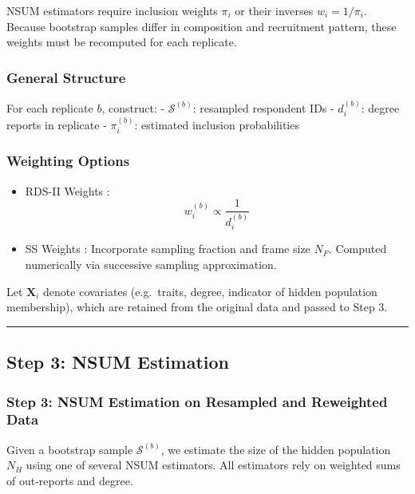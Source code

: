 \documentclass[
  12pt,
  letterpaper,
  DIV=11,
  numbers=noendperiod]{scrartcl}
\theoremstyle{plain}
\theoremstyle{definition}
\begin{document}
NSUM estimators require inclusion weights \(\pi_i\) or their inverses
\(w_i = 1 / \pi_i\). Because bootstrap samples differ in composition and
recruitment pattern, these weights must be recomputed for each
replicate.

\subsubsection{General Structure}\label{general-structure}

For each replicate \(b\), construct: - \(\mathcal{S}^{(b)}\): resampled
respondent IDs - \(d_i^{(b)}\): degree reports in replicate -
\(\pi_i^{(b)}\): estimated inclusion probabilities

\subsubsection{Weighting Options}\label{weighting-options}

\begin{itemize}
\item
  RDS-II Weights \autocite{volz08-probability}: \[
  w_i^{(b)} \propto \frac{1}{d_i^{(b)}}
  \]
\item
  SS Weights \autocite{gile11-improved}: Incorporate sampling fraction
  and frame size \(N_F\). Computed numerically via successive sampling
  approximation.
\end{itemize}

Let \(\mathbf{X}_i\) denote covariates (e.g.~traits, degree, indicator
of hidden population membership), which are retained from the original
data and passed to Step 3.

\begin{center}\rule{0.5\linewidth}{0.5pt}\end{center}

\subsection{Step 3: NSUM Estimation}\label{step-3-nsum-estimation}

\subsubsection{Step 3: NSUM Estimation on Resampled and Reweighted
Data}\label{step-3-nsum-estimation-on-resampled-and-reweighted-data}

Given a bootstrap sample \(\mathcal{S}^{(b)}\), we estimate the size of
the hidden population \(N_H\) using one of several NSUM estimators. All
estimators rely on weighted sums of out-reports and degree.
\end{document}
